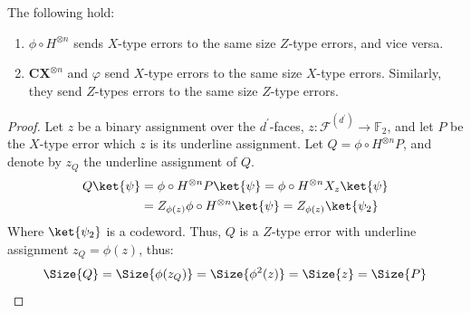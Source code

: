 \begin{claim}
  \label{claim:bounded_size}
  The following hold:
  \begin{enumerate}
    \item $ \phi \circ  H^{\otimes n} $ sends $X$-type errors to the same size $Z$-type errors, and vice versa.  
    \item  $\mathbf{CX}^{\otimes n}$ and $\varphi$ send $X$-type errors to the same size $X$-type errors. Similarly, they send $Z$-types errors to the same size $Z$-type errors.  
  \end{enumerate}
\end{claim}
\begin{proof}
  Let $z$ be a binary assignment over the $d^{\prime}$-faces, $z : \mathcal{F}^{(d^{\prime})} \rightarrow \mathbb{F}_{2}$, and let $P$ be the $X$-type error which $z$ is its underline assignment. Let $ Q = \phi \circ H^{\otimes n} P $, and denote by $z_{Q}$ the underline assignment of $Q$. 
\begin{equation*}
  \begin{split}
    Q \ket{\psi} & = \phi \circ H^{\otimes n} P \ket{\psi} = \phi \circ H^{\otimes n} X_{z} \ket{\psi} \\ 
    & = Z_{\phi (z)} \phi \circ H^{\otimes n} \ket{\psi} = Z_{\phi (z) } \ket{\psi_{2}} 
  \end{split}
\end{equation*}
Where $\ket{\psi_{2}}$ is a codeword. Thus, $Q$ is a $Z$-type error with underline assignment $z_{Q} = \phi(z)$, thus: 
\begin{equation*}
  \begin{split}
    \Size{Q} = \Size{\phi(z_{Q})} = \Size{\phi^{2}(z) } = \Size{z} = \Size{P}
  \end{split}
\end{equation*}



\end{proof}
